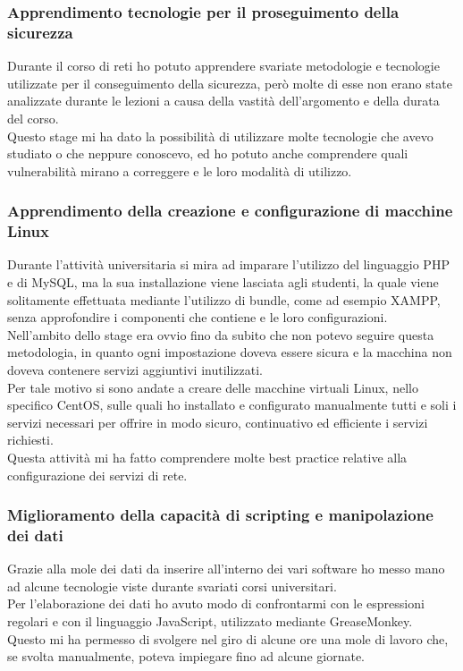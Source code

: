 \documentclass[Tesi.tex]{subfiles}
\begin{document}
\subsubsection{Apprendimento tecnologie per il proseguimento della sicurezza}
Durante il corso di reti ho potuto apprendere svariate metodologie e tecnologie utilizzate per il conseguimento della sicurezza, però molte di esse non erano state analizzate durante le lezioni a causa della vastità dell'argomento e della durata del corso. \\
Questo stage mi ha dato la possibilità di utilizzare molte tecnologie che avevo studiato o che neppure conoscevo, ed ho potuto anche comprendere quali vulnerabilità mirano a correggere e le loro modalità di utilizzo.

\subsubsection{Apprendimento della creazione e configurazione di macchine Linux}
Durante l'attività universitaria si mira ad imparare l'utilizzo del linguaggio PHP e di MySQL, ma la sua installazione viene lasciata agli studenti, la quale viene solitamente effettuata mediante l'utilizzo di bundle, come ad esempio XAMPP, senza approfondire i componenti che contiene e le loro configurazioni. \\
Nell'ambito dello stage era ovvio fino da subito che non potevo seguire questa metodologia, in quanto ogni impostazione doveva essere sicura e la macchina non doveva contenere servizi aggiuntivi inutilizzati. \\
Per tale motivo si sono andate a creare delle macchine virtuali Linux, nello specifico CentOS, sulle quali ho installato e configurato manualmente tutti e soli i servizi necessari per offrire in modo sicuro, continuativo ed efficiente i servizi richiesti. \\
Questa attività mi ha fatto comprendere molte best practice relative alla configurazione dei servizi di rete.

\subsubsection{Miglioramento della capacità di scripting e manipolazione dei dati}
Grazie alla mole dei dati da inserire all'interno dei vari software ho messo mano ad alcune tecnologie viste durante svariati corsi universitari. \\
Per l'elaborazione dei dati ho avuto modo di confrontarmi con le espressioni regolari e con il linguaggio JavaScript, utilizzato mediante GreaseMonkey. \\
Questo mi ha permesso di svolgere nel giro di alcune ore una mole di lavoro che, se svolta manualmente, poteva impiegare fino ad alcune giornate.
\end{document}
